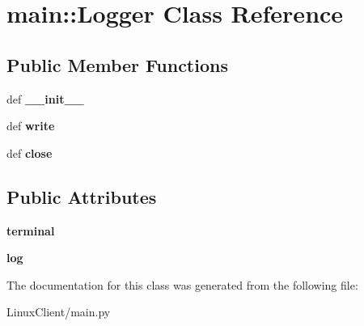 \hypertarget{classmain_1_1Logger}{
\section{main::Logger Class Reference}
\label{classmain_1_1Logger}
}
\subsection*{Public Member Functions}
\begin{DoxyCompactItemize}
\item 
\hypertarget{classmain_1_1Logger_ae141309e6bce54502b6b17b5825f527d}{
def {\bfseries \_\-\_\-init\_\-\_\-}}
\label{classmain_1_1Logger_ae141309e6bce54502b6b17b5825f527d}

\item 
\hypertarget{classmain_1_1Logger_a1874e4422b5ce2045a9f6418904e0d12}{
def {\bfseries write}}
\label{classmain_1_1Logger_a1874e4422b5ce2045a9f6418904e0d12}

\item 
\hypertarget{classmain_1_1Logger_a87babf469d84300a75adf06314b86de7}{
def {\bfseries close}}
\label{classmain_1_1Logger_a87babf469d84300a75adf06314b86de7}

\end{DoxyCompactItemize}
\subsection*{Public Attributes}
\begin{DoxyCompactItemize}
\item 
\hypertarget{classmain_1_1Logger_a0a76b4eace0834c307e1d76d540713a1}{
{\bfseries terminal}}
\label{classmain_1_1Logger_a0a76b4eace0834c307e1d76d540713a1}

\item 
\hypertarget{classmain_1_1Logger_aa645ce3be1efd94687b51cafa443c7a6}{
{\bfseries log}}
\label{classmain_1_1Logger_aa645ce3be1efd94687b51cafa443c7a6}

\end{DoxyCompactItemize}


The documentation for this class was generated from the following file:\begin{DoxyCompactItemize}
\item 
LinuxClient/main.py\end{DoxyCompactItemize}
